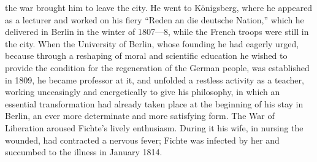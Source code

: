 the war brought him to leave the city. He went to Königsberg, where he
appeared as a lecturer and worked on his fiery ``Reden an die deutsche
Nation,'' which he delivered in Berlin in the winter of 1807---8, while
the French troops were still in the city. When the University of
Berlin, whose founding he had eagerly urged, because through a
reshaping of moral and scientific education he wished to provide the
condition for the regeneration of the German people, was established in
1809, he became professor at it, and unfolded a restless activity as a
teacher, working unceasingly and energetically to give his philosophy,
in which an essential transformation had already taken place at the
beginning of his stay in Berlin, an ever more determinate and more
satisfying form. The War of Liberation aroused Fichte's lively
enthusiasm. During it his wife, in nursing the wounded, had contracted
a nervous fever; Fichte was infected by her and succumbed to the
illness in January 1814.

